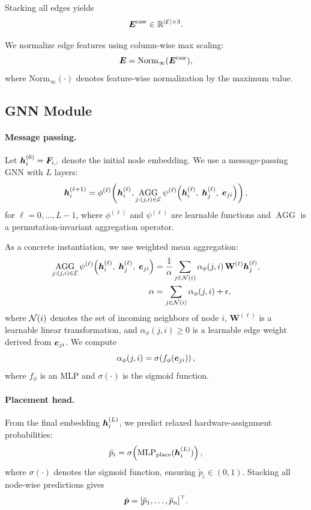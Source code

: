 Stacking all edges yields
\begin{equation}
{\bm{E}}^{\mathrm{raw}} \in \mathbb{R}^{|{\mathcal{E}}|\times 3}.
\end{equation}

We normalize edge features using column-wise max scaling:
\begin{equation}
{\bm{E}} = \mathrm{Norm}_\infty({\bm{E}}^{\mathrm{raw}}),
\end{equation}
where $\mathrm{Norm}_\infty(\cdot)$ denotes feature-wise normalization by the maximum value.

\subsection{GNN Module}

\paragraph{\textbf{Message passing.}}
Let ${\bm{h}}_i^{(0)}={\bm{F}}_{i,:}$ denote the initial node embedding. We use a message-passing GNN with $L$ layers:
\begin{equation}
{\bm{h}}_i^{(\ell+1)}=
\phi^{(\ell)}\!\left(
{\bm{h}}_i^{(\ell)},
\operatorname*{AGG}_{j:(j,i)\in{\mathcal{E}}}
\psi^{(\ell)}\!\left(
{\bm{h}}_i^{(\ell)},\;
{\bm{h}}_j^{(\ell)},\;
{\bm{e}}_{ji}
\right)
\right),
\end{equation}
for $\ell=0,\dots,L-1$, where $\phi^{(\ell)}$ and $\psi^{(\ell)}$ are learnable functions and $\operatorname*{AGG}$ is a permutation-invariant aggregation operator.

As a concrete instantiation, we use weighted mean aggregation:
\begin{align*}
\operatorname*{AGG}_{j:(j,i)\in{\mathcal{E}}}
\psi^{(\ell)}\!\left(
{\bm{h}}_i^{(\ell)},\;
{\bm{h}}_j^{(\ell)},\;
{\bm{e}}_{ji}
\right)
&=\frac{1}{\alpha}\sum_{j\in{\mathcal{N}}(i)}\alpha_{\phi}(j,i)\,\mathbf{W}^{(\ell)}{\bm{h}}_j^{(\ell)},\\
\alpha &= \sum_{j\in{\mathcal{N}}(i)} \alpha_{\phi}(j,i)+\epsilon,
\end{align*}
where ${\mathcal{N}}(i)$ denotes the set of incoming neighbors of node $i$, $\mathbf{W}^{(\ell)}$ is a learnable linear transformation, and $\alpha_{\phi}(j,i)\ge 0$ is a learnable edge weight derived from ${\bm{e}}_{ji}$. We compute
\begin{equation}
\alpha_{\phi}(j,i)=\sigma\!\left(f_{\phi}({\bm{e}}_{ji})\right),
\end{equation}
where $f_{\phi}$ is an MLP and $\sigma(\cdot)$ is the sigmoid function.

\paragraph{\textbf{Placement head.}}
From the final embedding ${\bm{h}}_i^{(L)}$, we predict relaxed hardware-assignment probabilities:
\begin{equation}
\tilde{p}_i = \sigma\!\left(\mathrm{MLP}_{\mathrm{place}}({\bm{h}}_i^{(L)})\right),
\end{equation}
where $\sigma(\cdot)$ denotes the sigmoid function, ensuring $\tilde{p}_i\in(0,1)$. Stacking all node-wise predictions gives
\begin{equation}
\tilde{{\bm{p}}} = [\tilde{p}_1,\dots,\tilde{p}_n]^\top .
\end{equation}

